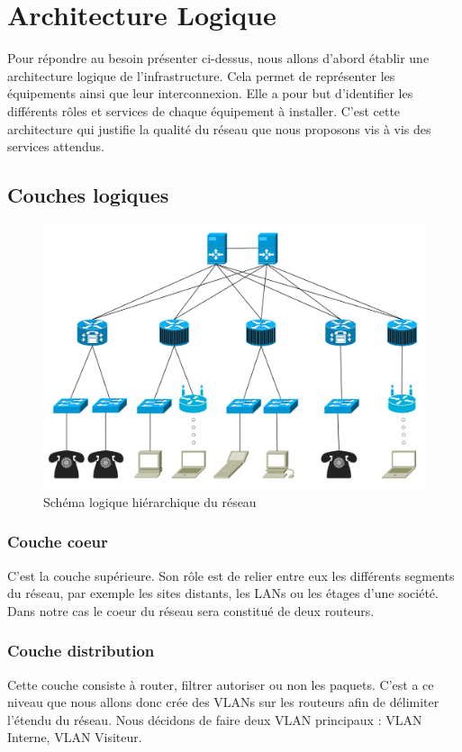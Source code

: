 \section{Architecture Logique}

Pour répondre au besoin présenter ci-dessus, nous allons d'abord établir une architecture logique de l'infrastructure.
Cela permet de représenter les équipements ainsi que leur interconnexion.
Elle a pour but d'identifier les différents rôles et services de chaque équipement à installer.
C'est cette architecture qui justifie la qualité du réseau que nous proposons vis à vis des services attendus.

%
%
\subsection{Couches logiques}

\begin{figure}[!ht]
    \center
    \includegraphics[width=1\textwidth]{./images/schema-logique.png}
    \caption{Schéma logique hiérarchique du réseau}
\end{figure}

%
    \cleardoublepage
%

\subsubsection{Couche coeur}
C’est la couche supérieure.
Son rôle est de relier entre eux les différents segments du réseau, par exemple les sites distants, les LANs ou les étages d'une société.
Dans notre cas le coeur du réseau sera constitué de deux routeurs.

\subsubsection{Couche distribution}
Cette couche consiste à router, filtrer autoriser ou non les paquets.
C'est a ce niveau que nous allons donc crée des VLANs sur les routeurs afin de délimiter l'étendu du réseau.
Nous décidons de faire deux VLAN principaux : VLAN Interne, VLAN Visiteur.

